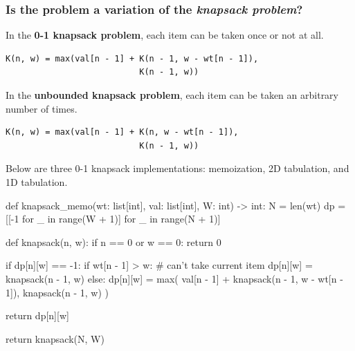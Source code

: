 \documentclass[12pt, titlepage]{article}
\begin{document}
\subsubsection{Is the problem a variation of the \textit{knapsack problem}?}

\begin{center}
 \medskip
\end{center}

In the \textbf{0-1 knapsack problem}, each item can be taken once or not at all. \medskip
\begin{center}
\begin{varwidth}{\linewidth}
\begin{verbatim}
K(n, w) = max(val[n - 1] + K(n - 1, w - wt[n - 1]),
                           K(n - 1, w))
\end{verbatim}
\end{varwidth}
\end{center}

In the \textbf{unbounded knapsack problem}, each item can be taken an arbitrary number of times. \medskip
\begin{center}
\begin{varwidth}{\linewidth}
\begin{verbatim}
K(n, w) = max(val[n - 1] + K(n, w - wt[n - 1]),
                           K(n - 1, w))
\end{verbatim}
\end{varwidth}
\end{center}

Below are three 0-1 knapsack implementations: memoization, 2D tabulation, and 1D tabulation. \medskip

\begin{python}
def knapsack_memo(wt: list[int], val: list[int], W: int) -> int:
    N = len(wt)
    dp = [[-1 for _ in range(W + 1)] for _ in range(N + 1)]

    def knapsack(n, w):
        if n == 0 or w == 0:
            return 0

        if dp[n][w] == -1:
            if wt[n - 1] > w:  # can't take current item
                dp[n][w] = knapsack(n - 1, w)
            else:
                dp[n][w] = max(
                    val[n - 1] + knapsack(n - 1, w - wt[n - 1]),
                    knapsack(n - 1, w)
                )

        return dp[n][w]

    return knapsack(N, W)
\end{python}
\end{document}
